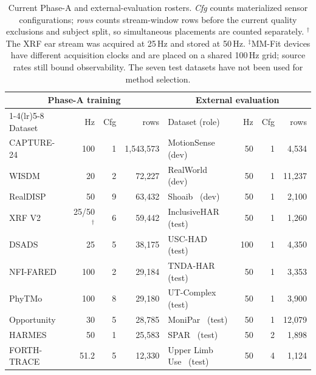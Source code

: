 \begin{table}[t]
  \centering
  \caption{Current Phase-A and external-evaluation rosters. \emph{Cfg} counts materialized sensor
  configurations; \emph{rows} counts stream-window rows before the current quality exclusions and
  subject split, so simultaneous placements are counted separately. $^\dagger$The XRF ear stream was
  acquired at 25\,Hz and stored at 50\,Hz. $^\ddagger$MM-Fit devices have different acquisition
  clocks and are placed on a shared 100\,Hz grid; source rates still bound observability. The seven
  test datasets have not been used for method selection.}
  \label{tab:datasets}
  \scriptsize
  \setlength{\tabcolsep}{3.2pt}
  \begin{tabular}{@{}lrrr@{\hspace{8mm}}lrrr@{}}
    \toprule
    \multicolumn{4}{c}{Phase-A training} & \multicolumn{4}{c}{External evaluation} \\
    \cmidrule(lr){1-4}\cmidrule(lr){5-8}
    Dataset & Hz & Cfg & rows & Dataset (role) & Hz & Cfg & rows \\
    \midrule
    CAPTURE-24~\cite{chan2024capture24} & 100 & 1 & 1,543,573
      & MotionSense~\cite{motionsense} (dev) & 50 & 1 & 4,534 \\
    WISDM~\cite{wisdm} & 20 & 2 & 72,227
      & RealWorld~\cite{realworld} (dev) & 50 & 1 & 11,237 \\
    RealDISP~\cite{realdisp} & 50 & 9 & 63,432
      & Shoaib~\cite{shoaib} (dev) & 50 & 1 & 2,100 \\
    XRF V2~\cite{xrf_v2} & 25/50$^\dagger$ & 6 & 59,442
      & InclusiveHAR~\cite{inclusivehar} (test) & 50 & 1 & 1,260 \\
    DSADS~\cite{dsads} & 25 & 5 & 38,175
      & USC-HAD~\cite{usc_had} (test) & 100 & 1 & 4,350 \\
    NFI-FARED~\cite{nfi_fared} & 100 & 2 & 29,184
      & TNDA-HAR~\cite{tnda_har} (test) & 50 & 1 & 3,353 \\
    PhyTMo~\cite{phytmo} & 100 & 8 & 29,180
      & UT-Complex~\cite{ut_complex} (test) & 50 & 1 & 3,900 \\
    Opportunity~\cite{opportunity_challenge} & 30 & 5 & 28,785
      & MoniPar~\cite{monipar} (test) & 50 & 1 & 12,079 \\
    HARMES~\cite{harmes} & 50 & 1 & 25,583
      & SPAR~\cite{spar} (test) & 50 & 2 & 1,898 \\
    FORTH-TRACE~\cite{forth_trace} & 51.2 & 5 & 12,330
      & Upper Limb Use~\cite{upper_limb_use} (test) & 50 & 4 & 1,124 \\

\end{tabular}
\end{table}
